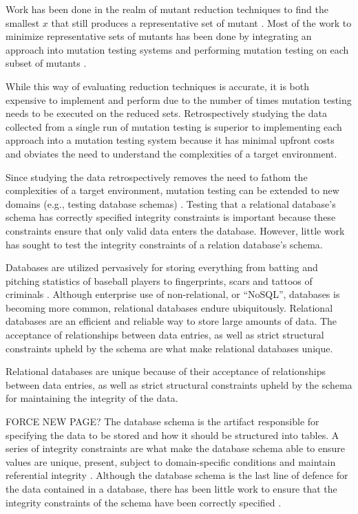 Work has been done in the realm of mutant reduction techniques to find the smallest $x$ that still produces
a representative set of mutant \cite{jia2011analysis, mathur1994empirical}. Most of the work
to minimize representative sets of mutants has been done by integrating an approach into
mutation testing systems and performing mutation testing on each subset of mutants \cite{demillo1988extended, king1991fortran}.

While this way of evaluating reduction techniques is accurate, it is both
expensive to implement and perform due to the number of times mutation testing
needs to be executed on the reduced sets. Retrospectively studying the data
collected from a single run of mutation testing is superior to implementing each
approach into a mutation testing system because it has minimal upfront costs and obviates the need
to understand the complexities of a target environment.

Since studying the data retrospectively removes the need to fathom the complexities of a target environment,
mutation testing can be extended to new domains (e.g., testing database schemas) \cite{mcminn2016virtual, mcminn2015effectiveness, wright2013efficient}.
Testing that a relational database's schema has correctly specified integrity constraints is important
because these constraints ensure that only valid data enters the database. However, little work has
sought to test the integrity constraints of a relation database's schema.

Databases are utilized pervasively for storing everything from batting and pitching statistics of baseball
players \cite{lahmanbaseball} to fingerprints, scars and tattoos of criminals \cite{ngi}.
Although enterprise use of non-relational, or ``NoSQL'', databases is becoming more common,
relational databases endure ubiquitously.
Relational databases are an efficient and reliable way to store large amounts of data.
The acceptance of relationships between data entries, as well as strict structural constraints
upheld by the schema are what make relational databases unique.

Relational databases are unique because of their acceptance of relationships between
data entries, as well as strict structural constraints upheld by the schema for maintaining the integrity
of the data.

FORCE NEW PAGE?
The database schema is the artifact responsible for specifying the data to be stored and
how it should be structured into tables. A series of integrity constraints
are what make the database schema able to ensure values are unique, present,
subject to domain-specific conditions and maintain referential integrity \cite{mcminn2016virtual}.
Although the database schema is the last line of defence for the data contained
in a database, there has been little work to ensure that the integrity constraints
of the schema have been correctly specified \cite{mcminn2015effectiveness}.


